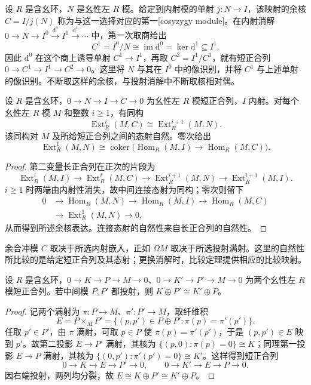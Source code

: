 设 \(R\) 是含幺环，\(N\) 是幺性左 \(R\) 模。给定到内射模的单射 \(j:N\to I\)，该映射的余核 \(C=I/j(N)\) 称为与这一选择对应的第一[cosyzygy module]。在内射消解 \(0\to N\to I^0\xrightarrow{\mathrm{d}^0}I^1\xrightarrow{\mathrm{d}^1}\cdots\) 中，第一次取商给出
\[
	C^1=I^0/N\cong\operatorname{im}\mathrm{d}^0=\ker \mathrm{d}^1\subseteq I^1.
\]
因此 \(\mathrm{d}^0\) 在这个商上诱导单射 \(C^1\to I^1\)，再取 \(C^2=I^1/C^1\)，就有短正合列 \(0\to C^1\to I^1\to C^2\to0\)。这里将 \(N\) 与其在 \(I^0\) 中的像识别，并将 \(C^1\) 与上述单射的像识别。不断取这样的余核，与投射消解中不断取核相对偶。

\begin{proposition}\label{b4:prop:injective-dimension-shift}
	设 \(R\) 是含幺环，\(0\to N\to I\to C\to0\) 为幺性左 \(R\) 模短正合列，\(I\) 内射。对每个幺性左 \(R\) 模 \(M\) 和整数 \(i\ge1\)，有同构
	\[
		\operatorname{Ext}_R^i(M,C)\cong\operatorname{Ext}_R^{i+1}(M,N).
	\]
	该同构对 \(M\) 及所给短正合列之间的态射自然。零次给出
	\[
		\operatorname{Ext}_R^1(M,N)\cong \operatorname{coker}\bigl(\operatorname{Hom}_R(M,I)\to\operatorname{Hom}_R(M,C)\bigr).
	\]
\end{proposition}
\begin{proof}
	第二变量长正合列在正次的片段为
	\[
		\operatorname{Ext}_R^i(M,I)\longrightarrow\operatorname{Ext}_R^i(M,C) \longrightarrow\operatorname{Ext}_R^{i+1}(M,N) \longrightarrow\operatorname{Ext}_R^{i+1}(M,I).
	\]
	\(i\ge1\) 时两端由内射性消失，故中间连接态射为同构；零次则留下
	\[
		\begin{aligned}
			0&\longrightarrow\operatorname{Hom}_R(M,N)\longrightarrow\operatorname{Hom}_R(M,I) \longrightarrow\operatorname{Hom}_R(M,C)\\
			&\longrightarrow\operatorname{Ext}_R^1(M,N)\longrightarrow0,
		\end{aligned}
	\]
	从而得到所述余核表达。连接态射的自然性来自长正合列的自然性。
\end{proof}

余合冲模 \(C\) 取决于所选内射嵌入，正如 \(\Omega M\) 取决于所选投射满射。这里的自然性所比较的是给定短正合列及其态射；更换消解时，比较定理提供相应的比较映射。

\begin{lemma}[Schanuel 引理]\label{b4:lem:schanuel}
	设 \(R\) 是含幺环，\(0\to K\to P\to M\to0\)、\(0\to K'\to P'\to M\to0\) 为两个幺性左 \(R\) 模短正合列。若中间模 \(P,P'\) 都投射，则 \(K\oplus P'\cong K'\oplus P\)。
\end{lemma}
\begin{proof}
	记两个满射为 \(\pi:P\to M\)、\(\pi':P'\to M\)，取纤维积
	\[
		E=P\times_M P'=\{(p,p')\in P\oplus P':\pi(p)=\pi'(p')\}.
	\]
	任取 \(p'\in P'\)，由 \(\pi\) 满射，可取 \(p\in P\) 使 \(\pi(p)=\pi'(p')\)，于是 \((p,p')\in E\) 映到 \(p'\)。故第二投影 \(E\to P'\) 满射，其核为 \(\{(p,0):\pi(p)=0\}\cong K\)；同理第一投影 \(E\to P\) 满射，其核为 \(\{(0,p'):\pi'(p')=0\}\cong K'\)。这样得到短正合列
	\[
		0\longrightarrow K\longrightarrow E\longrightarrow P'\longrightarrow0, \qquad 0\longrightarrow K'\longrightarrow E\longrightarrow P\longrightarrow0.
	\]
	因右端投射，两列均分裂，故 \(E\cong K\oplus P'\cong K'\oplus P\)。
\end{proof}

